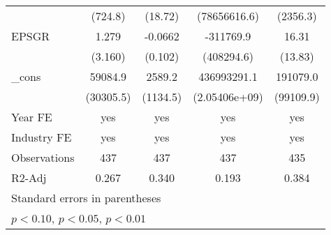 \begin{table}[htbp]
\begin{tabular}{l*{4}{c}}
                    &     (724.8)         &     (18.72)         &(78656616.6)         &    (2356.3)         \\
EPSGR               &       1.279         &     -0.0662         &   -311769.9         &       16.31         \\
                    &     (3.160)         &     (0.102)         &  (408294.6)         &     (13.83)         \\
\_cons              &     59084.9\sym{*}  &      2589.2\sym{**} & 436993291.1         &    191079.0\sym{*}  \\
                    &   (30305.5)         &    (1134.5)         &(2.05406e+09)         &   (99109.9)         \\
\hline
Year FE             &         yes         &         yes         &         yes         &         yes         \\
Industry FE         &         yes         &         yes         &         yes         &         yes         \\
Observations        &         437         &         437         &         437         &         435         \\
R2-Adj              &       0.267         &       0.340         &       0.193         &       0.384         \\
\hline\hline
\multicolumn{5}{l}{\footnotesize Standard errors in parentheses}\\
\multicolumn{5}{l}{\footnotesize \sym{*} \(p<0.10\), \sym{**} \(p<0.05\), \sym{***} \(p<0.01\)}\\
\end{tabular}
\end{table}
